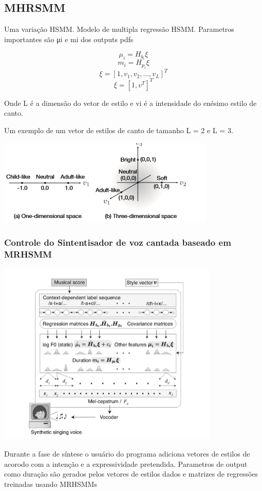 		\subsection{MHRSMM}
		Uma variação HSMM. Modelo de multipla regressão HSMM.
		Parametros importantes são μi e mi dos outputs pdfs
		
		\[ \mu_i = H_b_i \xi \] 
		\[	m_i   = H_p_i \xi  \]
		\[ \xi   = [1,v_1,v_2,...,v_L]^T \]	
		\[ \xi   = [1,v^T]^T	\]	
		
		Onde L é a dimensão do vetor de estilo e vi  é  a intensidade do  enésimo estilo de canto.
		
		Um exemplo de um vetor de estilos de canto de tamanho L =  2 e L = 3.
		
		\includegraphics{exemploHMM.png}
		
		\subsubsection{Controle do Sintentisador de voz cantada baseado em MRHSMM}
		
		\includegraphics{esquemaHMM.png}
		
		Durante a fase de síntese o usuário do programa adiciona vetores de estilos de acorodo com a intenção e a expressividade pretendida.
		Parametros de output como duração são gerados pelos vetores de estilos dados e matrizes de regressões treinadas usando MRHSMMs
		
